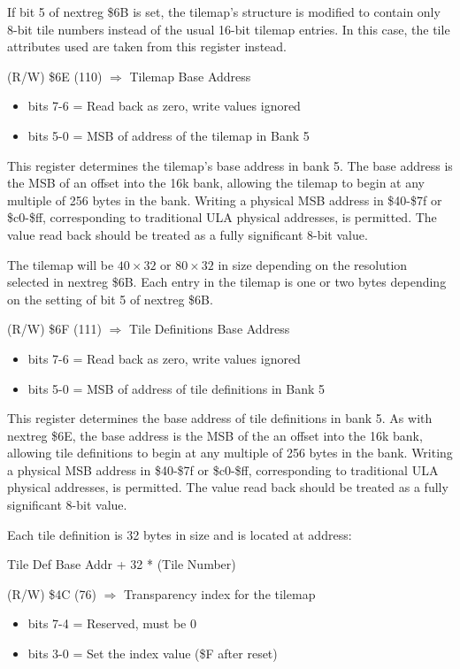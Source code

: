 If bit 5 of nextreg \$6B is set, the tilemap's structure is modified
to contain only 8-bit tile numbers instead of the usual 16-bit tilemap
entries.  In this case, the tile attributes used are taken from this
register instead.

(R/W) \$6E (110) $\Rightarrow$ Tilemap Base Address
\begin{itemize}
\item bits 7-6 = Read back as zero, write values ignored
\item bits 5-0 = MSB of address of the tilemap in Bank 5
\end{itemize}

This register determines the tilemap's base address in bank 5.  The
base address is the MSB of an offset into the 16k bank, allowing the
tilemap to begin at any multiple of 256 bytes in the bank.  Writing a
physical MSB address in \$40-\$7f or \$c0-\$ff, corresponding to
traditional ULA physical addresses, is permitted.  The value read back
should be treated as a fully significant 8-bit value.

The tilemap will be $40\times32$ or $80\times32$ in size depending on
the resolution selected in nextreg \$6B.  Each entry in the tilemap is
one or two bytes depending on the setting of bit 5 of nextreg \$6B.

(R/W) \$6F (111) $\Rightarrow$ Tile Definitions Base Address
\begin{itemize}
\item bits 7-6 = Read back as zero, write values ignored
\item bits 5-0 = MSB of address of tile definitions in Bank 5
\end{itemize}

This register determines the base address of tile definitions in bank
5.  As with nextreg \$6E, the base address is the MSB of the an offset
into the 16k bank, allowing tile definitions to begin at any multiple
of 256 bytes in the bank.  Writing a physical MSB address in \$40-\$7f
or \$c0-\$ff, corresponding to traditional ULA physical addresses, is
permitted.  The value read back should be treated as a fully
significant 8-bit value.

Each tile definition is 32 bytes in size and is located at address:

  Tile Def Base Addr + 32 * (Tile Number)

(R/W) \$4C (76) $\Rightarrow$ Transparency index for the tilemap
\begin{itemize}
\item bits 7-4 = Reserved, must be 0
\item bits 3-0 = Set the index value (\$F after reset)
\end{itemize}

